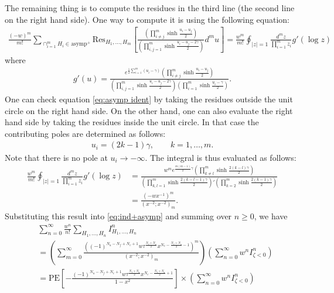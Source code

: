 \documentclass[a4paper,11pt]{article}
\begin{document}
The remaining thing is to compute the residues in the third line (the second line on the right hand side). One way to compute it is using the following equation:
\begin{align}
\label{eq:asymp ident}
\frac{(-w)^m}{m!} \sum_{\cap_{i = 1}^m H_i \in \text{asymp}^+} \mathrm{Res}_{H_1,\ldots,H_m} \left[\frac{\left(\prod_{i \neq j}^m \sinh \frac{u_i-u_j}{2}\right)}{\left(\prod_{i,j = 1}^m \sinh \frac{u_i-u_j-2 \gamma}{2}\right)} d^m u\right] = \frac{w^m}{m!} \oint_{|z| = 1} \frac{d^m z}{\prod_{i = 1}^m z_i} g'(\log z)
\end{align}
where
\begin{align}
g'(u) = \frac{e^{\frac{1}{2} \sum_{i = 1}^m (u_i-\gamma)} \left(\prod_{i \neq j}^m \sinh \frac{u_i-u_j}{2}\right)}{\left(\prod_{i,j = 1}^m \sinh \frac{u_i-u_j-2 \gamma}{2}\right) \left(\prod_{i = 1}^m \sinh \frac{u_i-\gamma}{2}\right)}.
\end{align}
One can check equation \eqref{eq:asymp ident} by taking the residues outside the unit circle on the right hand side. On the other hand, one can also evaluate the right hand side by taking the residues inside the unit circle. In that case the contributing poles are determined as follows:
\begin{align}
u_i = (2 k-1) \gamma, \qquad k = 1,\ldots,m.
\end{align}
Note that there is no pole at $u_i \rightarrow -\infty$. The integral is thus evaluated as follows:
\begin{align}
%
\frac{w^m}{m!} \oint_{|z| = 1} \frac{d^m z}{\prod_{i = 1}^m z_i} g'(\log z) &= \frac{w^m e^{\frac{m (m-1)}{2} \gamma} \left(\prod_{k \neq l}^m \sinh \frac{2 (k-l) \gamma}{2}\right)}{\left(\prod_{k,l = 1}^m \sinh \frac{2 (k-l-1) \gamma}{2}\right)' \left(\prod_{k = 2}^m \sinh \frac{2 (k-1) \gamma}{2}\right)} \\
&= \frac{(-w x^{-1})^m}{(x^{-2};x^{-2})_m}.
%
\end{align}
Substituting this result into \eqref{eq:ind+asymp} and summing over $n \geq 0$, we have
\begin{align}
%
& \sum_{n = 0}^\infty \frac{w^n}{n!} \sum_{H_1,\ldots,H_n} I^n_{H_1,\ldots,H_n} \nonumber \\
&= \left(\sum_{m = 0}^\infty \frac{((-1)^{N_a-N_f+N_c+1} w \tau^{\frac{N_f+N_a}{2}} x^{N_c-\frac{N_f+N_a}{2}-1})^m}{(x^{-2};x^{-2})_m}\right) \left(\sum_{n = 0}^\infty w^n I^n_{\zeta < 0}\right) \\
&= \mathrm{PE}\left[-\frac{(-1)^{N_a-N_f+N_c+1} w \tau^{\frac{N_f+N_a}{2}} x^{N_c-\frac{N_f+N_a}{2}+1}}{1-x^2}\right] \times \left(\sum_{n = 0}^\infty w^n I^n_{\zeta < 0}\right) \label{eq:wc+}
%
\end{align}
\end{document}
